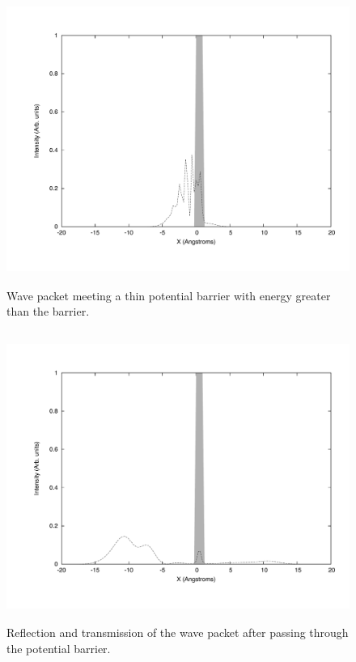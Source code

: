 \documentclass[12pt]{article}
\begin{document}
\begin{figure}[!h]
\centering
\includegraphics[width =120 mm, height = 95mm]{Ex_7_29_collis.pdf}
\caption{Wave packet meeting a thin potential barrier with energy greater than the barrier.}
\label{fig:729c}
\end{figure}
\begin{figure}[!h]
\centering
\includegraphics[width =120 mm, height = 95mm]{Ex_7_29_reflec.pdf}
\caption{Reflection and transmission of the wave packet after passing through the potential barrier.}
\label{fig:729r}
\end{figure}
\end{document}
